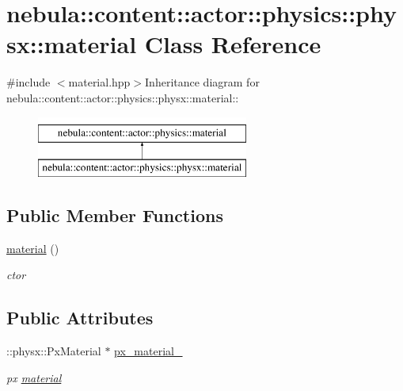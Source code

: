 \hypertarget{classnebula_1_1content_1_1actor_1_1physics_1_1physx_1_1material}{
\section{nebula::content::actor::physics::physx::material Class Reference}
\label{classnebula_1_1content_1_1actor_1_1physics_1_1physx_1_1material}
}


{\ttfamily \#include $<$material.hpp$>$}Inheritance diagram for nebula::content::actor::physics::physx::material::\begin{figure}[H]
\begin{center}
\leavevmode
\includegraphics[height=2cm]{classnebula_1_1content_1_1actor_1_1physics_1_1physx_1_1material}
\end{center}
\end{figure}
\subsection*{Public Member Functions}
\begin{DoxyCompactItemize}
\item 
\hyperlink{classnebula_1_1content_1_1actor_1_1physics_1_1physx_1_1material_afa246384bd44c571e4ca83bef401e818}{material} ()
\begin{DoxyCompactList}\small\item\em ctor \item\end{DoxyCompactList}\end{DoxyCompactItemize}
\subsection*{Public Attributes}
\begin{DoxyCompactItemize}
\item 
::physx::PxMaterial $\ast$ \hyperlink{classnebula_1_1content_1_1actor_1_1physics_1_1physx_1_1material_a7d95e2716e4cea5f6fcdd0bc2d82ff62}{px\_\-material\_\-}
\begin{DoxyCompactList}\small\item\em px \hyperlink{classnebula_1_1content_1_1actor_1_1physics_1_1physx_1_1material}{material} \item\end{DoxyCompactList}\end{DoxyCompactItemize}


